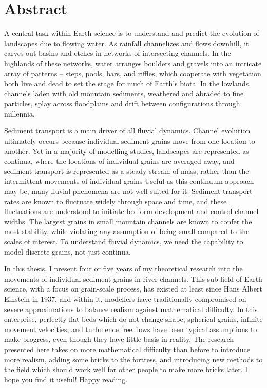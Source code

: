 
\chapter{Abstract}

A central task within Earth science is to understand and predict the evolution of landscapes due to flowing water.
As rainfall channelizes and flows downhill, it carves out basins and etches in networks of intersecting channels.
In the highlands of these networks, water arranges boulders and gravels into an intricate array of patterns -- steps, pools, bars, and riffles, which cooperate with vegetation both live and dead to set the stage for much of Earth's biota. In the lowlands, channels laden with old mountain sediments, weathered and abraded to fine particles, splay across floodplains and drift between configurations through millennia.

Sediment transport is a main driver of all fluvial dynamics.
Channel evolution ultimately occurs because individual sediment grains move from one location to another. Yet in a majority of modelling studies, landscapes are represented as continua, where the locations of individual grains are averaged away, and sediment transport is represented as a steady stream of mass, rather than the intermittent movements of individual grains
Useful as this continuum approach may be, many fluvial phenomena are not well-suited for it.
Sediment transport rates are known to fluctuate widely through space and time, and these fluctuations are understood to initiate bedform development and control channel widths. The largest grains in small mountain channels are known to confer the most stability, while violating any assumption of being small compared to the scales of interest. To understand fluvial dynamics, we need the capability to model discrete grains, not just continua.

In this thesis, I present four or five years of my theoretical research into the movements of individual sediment grains in river channels.
This sub-field of Earth science, with a focus on grain-scale process, has existed at least since Hans Albert Einstein in 1937, and within it, modellers have traditionally compromised on severe approximations to balance realism against mathematical difficulty.
In this enterprise, perfectly flat beds which do not change shape, spherical grains, infinite movement velocities, and turbulence free flows have been typical assumptions to make progress, even though they have little basis in reality.
The research presented here takes on more mathematical difficulty than before to introduce more realism, adding some bricks to the fortress, and introducing new methods to the field which should work well for other people to make more bricks later. I hope you find it useful! Happy reading.